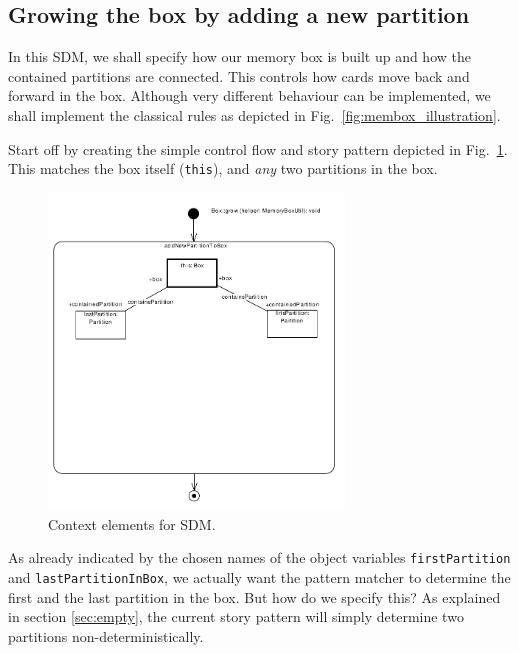 \subsection{Growing the box by adding a new partition}
\label{sec:sdm_grow}	
	
In this SDM, we shall specify how our memory box is built up and how the
contained partitions are connected.  This controls how cards move back and
forward in the box.  Although very different behaviour can be implemented, we
shall implement the classical rules as depicted in
Fig.~\ref{fig:membox_illustration}.

Start off by creating the simple control flow and story pattern depicted in
Fig.~\ref{fig:sdm_grow_1}.  This matches the box itself (\texttt{this}), and
\emph{any} two partitions in the box.
	
\begin{figure}[htp]
\begin{center}
  \includegraphics[width=0.7\textwidth]{pics/sdmBilder/grow/sdm57.pdf}
  \caption{Context elements for SDM.}  
  \label{fig:sdm_grow_1}
\end{center}
\end{figure}

As already indicated by the chosen names of the object variables
\texttt{first\-Partition} and \texttt{last\-Partition\-In\-Box}, we actually
want the pattern matcher to determine the first and the last partition in the box.
But how do we specify this?  As explained in section \ref{sec:empty}, the
current story pattern will simply determine two partitions
non-deterministically.  

